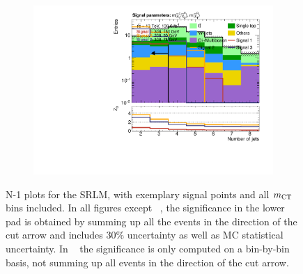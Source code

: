 \begin{figure}
\begin{subfigure}[b]{0.4\linewidth}
		\centering\includegraphics[width=\textwidth]{n1_SRLM_mct_bins/nJet30.pdf}
		\caption{\label{fig:Wh_reopt_second_round_n1_srlm_njet}}
	\end{subfigure}
	\caption{N-1 plots for the SRLM, with exemplary signal points and all $m_{\textrm{CT}}$ bins included. In all figures except \figname~, the significance in the lower pad is obtained by summing up all the events in the direction of the cut arrow and includes 30\% uncertainty as well as MC statistical uncertainty. In \figname~ the significance is only computed on a bin-by-bin basis, \ie not summing up all events in the direction of the cut arrow.}
	\label{fig:Wh_reopt_second_round_n1_srlm}
\end{figure}

